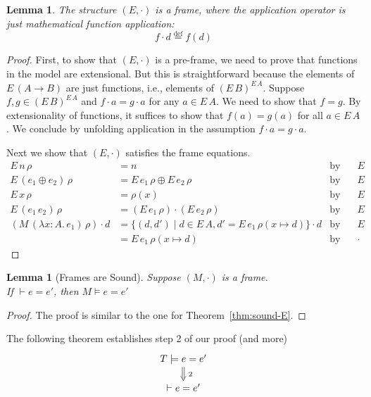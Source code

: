 \documentclass{tufte-handout}
\newcommand{\defeq}[0]{\overset{\mathrm{def}}{=}}
\newcommand{\LAM}[1]{\lambda #1.\,}
\newcommand{\APP}[0]{\,}
\newcommand{\of}[0]{\!:\!}
\newcommand{\ext}[3]{#3(#1{\mapsto}#2)}
\newtheorem{lemma}[theorem]{Lemma}
\begin{document}
\begin{lemma}
\label{lem:E-frame}
The structure $(E,\cdot)$ is a frame, where the application operator
is just mathematical function application:
\[
   f \cdot d \defeq f(d)
\]
\end{lemma}
\begin{proof}
 First, to show that $(E,\cdot)$ is a pre-frame, we need to prove that
 functions in the model are extensional. But this is straightforward
 because the elements of $E\,(A\to B)$ are just functions, i.e.,
 elements of $(E\,B)^{E\,A}$. Suppose $f,g \in (E\,B)^{E\,A}$ and $f
 \cdot a = g \cdot a$ for any $a \in E\,A$.  We need to show that $f =
 g$. By extensionality of functions, it suffices to show that $f(a) =
 g(a)$ for all $a \in E\,A$. We conclude by unfolding application in
 the assumption $f \cdot a = g \cdot a$.

 Next we show that $(E,\cdot)$ satisfies the frame equations.
 \begin{align*}
  E\,n\,\rho &= n & \text{by def. of $E$} \\
  E\,(e_1 \oplus e_2)\,\rho &= E\,e_1\,\rho \oplus E\,e_2\,\rho 
    & \text{by def. of $E$} \\
  E\,x\,\rho &= \rho(x) & \text{by def. of $E$} \\
  E\,(e_1\APP e_2)\,\rho &= (E\,e_1\,\rho) \cdot (E\,e_2\,\rho)
    & \text{by def. of $E$} \\[1ex]
      (M\,(\LAM{x\of A} e_1)\,\rho) \cdot d 
      &= \{ (d,d') \mid d \in E\,A,
            d' = E\,e_1\,\ext{x}{d}{\rho}\} \cdot d & \text{by def. of $E$}\\
      &= E\,e_1\,\ext{x}{d}{\rho} & \text{by def. of $\cdot$}
 \end{align*}
\end{proof}

\begin{lemma}[Frames are Sound]
  \label{lem:frame-sound}
  Suppose $(M,\cdot)$ is a frame.\\
  If $\vdash e = e'$, then $M \models e = e'$
\end{lemma}
\begin{proof}
    The proof is similar to the one for Theorem~\ref{thm:sound-E}.
\end{proof}

The following theorem establishes step 2 of our proof (and more)
\[
\xymatrix@=15pt{
  T \models e = e' \ar@{=>}[d]^{\;2} \\
  \vdash e = e'
}
\]
\end{document}
